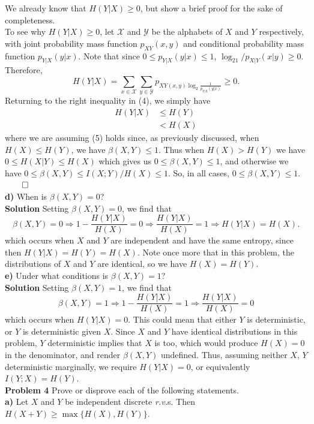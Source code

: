 \documentclass[11pt, letterpaper]{article}
\newcommand{\mc}[1]{\mathcal{#1}}
\begin{document}
We already know that $H(Y|X)\geq 0$, but show a brief proof for the sake of completeness. \\[10pt]
To see why $H(Y|X)\geq 0$, let $\mc{X}$ and $\mc{Y}$ be the alphabets of $X$ and $Y$ respectively, with joint probability mass function $p_{XY}(x,y)$ and
conditional probability mass function $p_{Y|X}(y|x)$. Note that since $0\leq p_{Y|X}(y|x)\leq 1$, $\log_21/p_{X|Y}(x|y)\geq 0$. Therefore,
\[H(Y|X)=\sum_{x\in\mc{X}}\sum_{y\in\mc{Y}}p_{XY(x,y)\log_2\frac{1}{p_{Y|X}(y|x)}}\geq 0.\]
Returning to the right inequality in (4), we simply have
\begin{align*}
    H(Y|X)&\leq H(Y)\tag{since conditioning reduces entropy}\\
    &<H(X)\tag{5}
\end{align*}
where we are assuming (5) holds since, as previously discussed, when $H(X)\leq H(Y)$, we have $\beta(X,Y)\leq 1$. Thus when $H(X)>H(Y)$ we have $0\leq H(X|Y)\leq H(X)$ which gives us $0\leq \beta(X,Y)\leq 1$, 
and otherwise we have $0\leq\beta(X,Y)\leq I(X;Y)/H(X)\leq 1$. So, in all cases, $0\leq \beta(X,Y)\leq 1$.\hfill{$\qed$}\\[10pt]
{\bf d)} When is $\beta(X,Y)=0$?\\[10pt]
{\bf Solution} Setting $\beta(X,Y)=0$, we find that
\[\beta(X,Y)=0\Rightarrow 1-\frac{H(Y|X)}{H(X)}=0\Rightarrow\frac{H(Y|X)}{H(X)}=1\Rightarrow H(Y|X)=H(X).\]
which occurs when $X$ and $Y$ are independent and have the same entropy, since then $H(Y|X)=H(Y)=H(X)$. Note once more that in this problem, the distributions of $X$ and $Y$ are identical, so we have $H(X)=H(Y)$.\\[10pt]
{\bf e)} Under what conditions is $\beta(X,Y)=1$?\\[10pt]
{\bf Solution} Setting $\beta(X,Y)=1$, we find that
\[\beta(X,Y)=1\Rightarrow 1-\frac{H(Y|X)}{H(X)}=1\Rightarrow\frac{H(Y|X)}{H(X)}=0\]
which occurs when $H(Y|X)=0$. This could mean that either $Y$ is deterministic, or $Y$ is deterministic given $X$. Since $X$ and $Y$ have identical distributions in this problem, $Y$ deterministic implies that $X$ is too, which
would produce $H(X)=0$ in the denominator, and render $\beta(X,Y)$ undefined. Thus, assuming neither $X$, $Y$ deterministic marginally, we require $H(Y|X)=0$, or equivalently $I(Y;X)=H(Y)$.\\[10pt]
{\bf Problem 4} Prove or disprove each of the following statements.\\[10pt]
{\bf a)} Let $X$ and $Y$ be independent discrete {\it r.v.}s. Then $H(X+Y)\geq\max\{H(X),H(Y)\}$.\\[10pt]
\end{document}
